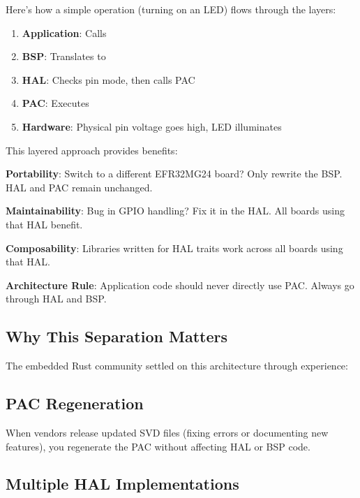 Here's how a simple operation (turning on an LED) flows through the layers:

\begin{enumerate}
    \item \textbf{Application}: Calls 
    \item \textbf{BSP}: Translates to 
    \item \textbf{HAL}: Checks pin mode, then calls PAC
    \item \textbf{PAC}: Executes 
    \item \textbf{Hardware}: Physical pin voltage goes high, LED illuminates
\end{enumerate}

This layered approach provides benefits:

\textbf{Portability}: Switch to a different EFR32MG24 board? Only rewrite the BSP. HAL and PAC remain unchanged.

\textbf{Maintainability}: Bug in GPIO handling? Fix it in the HAL. All boards using that HAL benefit.

\textbf{Composability}: Libraries written for HAL traits work across all boards using that HAL.

\begin{notebox}
    \textbf{Architecture Rule}: Application code should never directly use PAC. Always go through HAL and BSP.
\end{notebox}

\subsection{Why This Separation Matters}
\label{sec:separation-importance}

The embedded Rust community settled on this architecture through experience:

\subsection{PAC Regeneration}

When vendors release updated SVD files (fixing errors or documenting new features), you regenerate the PAC without affecting HAL or BSP code.

\subsection{Multiple HAL Implementations}

